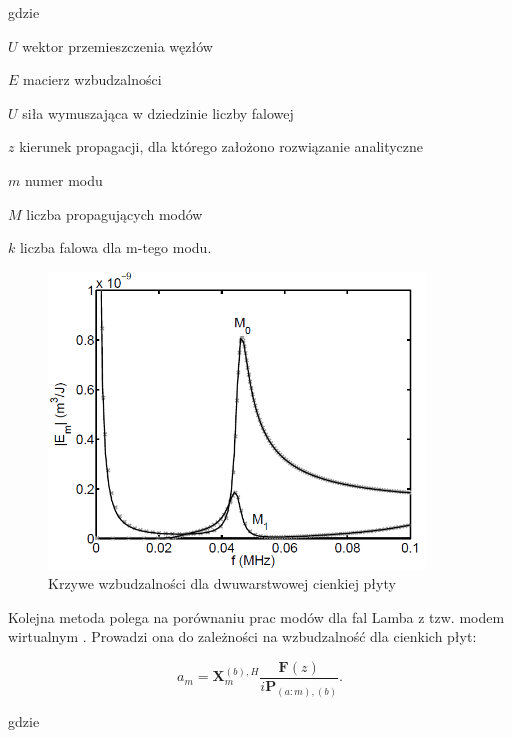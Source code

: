 gdzie
\begin{eqwhere}[2cm]
	\item[$U$] wektor przemieszczenia węzłów
	\item[$E$] macierz wzbudzalności
	\item[$U$] siła wymuszająca w dziedzinie liczby falowej
	\item[$z$] kierunek propagacji, dla którego założono rozwiązanie analityczne
	\item[$m$] numer modu
	\item[$M$] liczba propagujących modów
	\item[$k$] liczba falowa dla m-tego modu.	
\end{eqwhere}

\begin{figure}[h]
\centering
\includegraphics[width=10cm]{Zdjecia/2/wzbudzalnosc1}
\caption{Krzywe wzbudzalności dla dwuwarstwowej cienkiej płyty}
\label{fig:wzbudzalnosc1}
\end{figure}

Kolejna metoda polega na porównaniu prac modów dla fal Lamba z tzw. modem wirtualnym . Prowadzi ona do zależności na wzbudzalność dla cienkich płyt:

\begin{equation} \label{eq:wzbudzanie2}
a_m =  \textbf{X}_m^{(b), H} \frac{\textbf{F}(z)}{i\textbf{P}_{(a:m),(b)}}.
\end{equation}

gdzie


